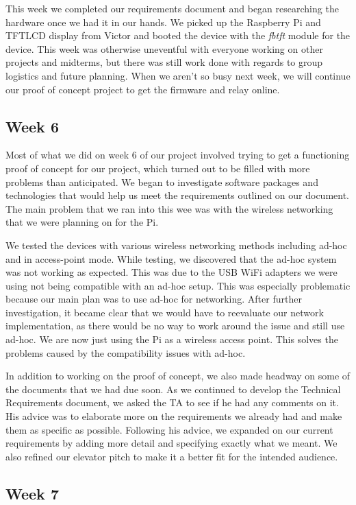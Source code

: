 \documentclass[letterpaper,10pt]{article}
\begin{document}
This week we completed our requirements document and began researching
the hardware once we had it in our hands. We picked up the Raspberry Pi
and TFTLCD display from Victor and booted the device with the \textit{fbtft} 
module for the device. This week was otherwise uneventful with everyone working
on other projects and midterms, but there was still work done with regards to 
group logistics and future planning. When we aren't so busy next week, we will
continue our proof of concept project to get the firmware and relay online.

\subsection{Week 6}
 
Most of what we did on week 6 of our project involved trying to get a functioning proof of concept for our project, which turned out to be filled with more problems than anticipated. We began to investigate software packages and technologies that would help us meet the requirements outlined on our document. The main problem that we ran into this wee was with the wireless networking that we were planning on for the Pi.

We tested the devices with various wireless networking methods including ad-hoc and in access-point mode. While testing, we discovered that the ad-hoc system was not working as expected. This was due to the USB WiFi adapters we were using not being compatible with an ad-hoc setup. This was especially problematic because our main plan was to use ad-hoc for networking. After further investigation, it became clear that we would have to reevaluate our network implementation, as there would be no way to work around the issue and still use ad-hoc. We are now just using the Pi as a wireless access point. This solves the problems caused by the compatibility issues with ad-hoc.

In addition to working on the proof of concept, we also made headway on some of the documents that we had due soon. As we continued to develop the Technical Requirements document, we asked the TA to see if he had any comments on it. His advice was to elaborate more on the requirements we already had and make them as specific as possible. Following his advice, we expanded on our current requirements by adding more detail and specifying exactly what we meant. We also refined our elevator pitch to make it a better fit for the intended audience.

\subsection{Week 7}  
\end{document}
